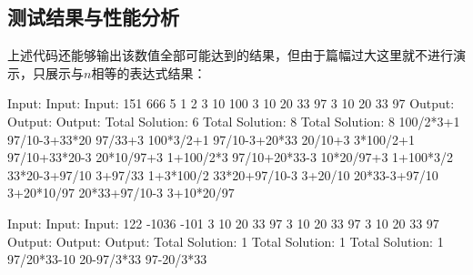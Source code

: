 \documentclass[12pt, a4paper, oneside]{ctexart}
\numberwithin{equation}{section}  %
\begin{document}
\subsection{测试结果与性能分析}
上述代码还能够输出该数值全部可能达到的结果，但由于篇幅过大这里就不进行演示，只展示与$n$相等的表达式结果：
\begin{cppcode}
Input:                  Input:                  Input:
151                     666                     5
1 2 3 10 100            3 10 20 33 97           3 10 20 33 97
Output:                 Output:                 Output:
Total Solution: 6       Total Solution: 8       Total Solution: 8
100/2*3+1               97/10-3+33*20           97/33+3
100*3/2+1               97/10-3+20*33           20/10+3
3*100/2+1               97/10+33*20-3           20*10/97+3
1+100/2*3               97/10+20*33-3           10*20/97+3
1+100*3/2               33*20-3+97/10           3+97/33
1+3*100/2               33*20+97/10-3           3+20/10
                        20*33-3+97/10           3+20*10/97
                        20*33+97/10-3           3+10*20/97

Input:                  Input:                  Input:
122                     -1036                   -101
3 10 20 33 97           3 10 20 33 97           3 10 20 33 97
Output:                 Output:                 Output:
Total Solution: 1       Total Solution: 1       Total Solution: 1
97/20*33-10             20-97/3*33              97-20/3*33
\end{cppcode}
\end{document}
